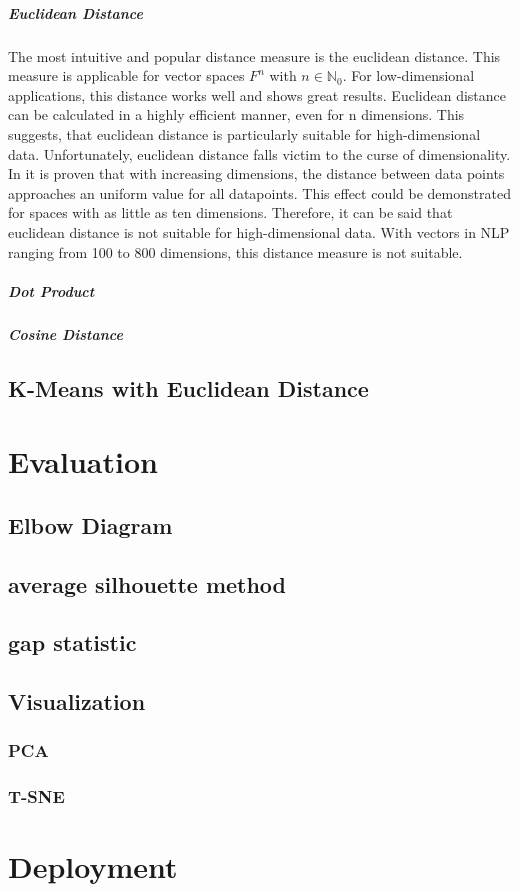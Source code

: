 	\subparagraph{Euclidean Distance} \label{euclidean}
	The most intuitive and popular distance measure is the euclidean distance. This measure is applicable for vector spaces $F^{n}$ with $n \in \mathbb{N}_0 $. For low-dimensional applications, this distance works well and shows great results. Euclidean distance can be calculated in a highly efficient manner, even for n dimensions. This suggests, that euclidean distance is particularly suitable for high-dimensional data. Unfortunately, euclidean distance falls victim to the curse of dimensionality. In \cite{beyerNearestNeighbor} it is proven that with increasing dimensions, the distance between data points approaches an uniform value for all datapoints. This effect could be demonstrated for spaces with as little as ten dimensions. Therefore, it can be said that euclidean distance is not suitable for high-dimensional data. With vectors in \ac{NLP} ranging from 100 to 800 dimensions, this distance measure is not suitable.
	
	\subparagraph{Dot Product}
	
	
	\subparagraph{Cosine Distance}
	
	
	\subsection{K-Means with Euclidean Distance}
\section{Evaluation}
	\subsection{Elbow Diagram}
	\subsection{average silhouette method}
	\subsection{gap statistic}
	\subsection{Visualization}
		\subsubsection{PCA}
		\subsubsection{T-SNE}
\section{Deployment}

